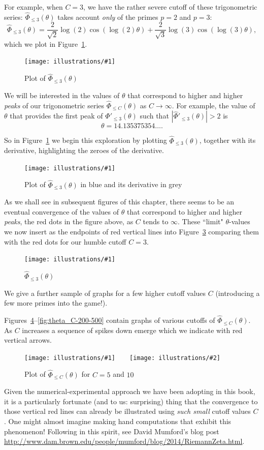 \documentclass[openany]{book}
\newcommand{\ill}[3]{%
   \begin{figure}[H]%
   \vspace{-2ex}
   \centering%
   \texttt{[image: illustrations/\#1]}%
   \caption{#3}%
   \vspace{-2ex}
    \end{figure}}
\newcommand{\illtwo}[4]{%
   \begin{figure}[H]\centering%
   \texttt{[image: illustrations/\#1]}$\qquad$\texttt{[image: illustrations/\#2]}%
   \caption{#4}%
    \end{figure}}
\theoremstyle{plain}
\theoremstyle{definition}
\begin{document}
{For example, when $C=3$, we have the rather severe cutoff of these trigonometric series: ${\hat \Phi}_{\leq 3}(\theta)$ takes account {\it only} of the primes $p=2$ and $p=3$:
$$
  {\hat \Phi}_{\leq 3}(\theta) =
  \frac{2}{\sqrt{2}} \log(2)\cos(\log(2)\theta)
 +
 \frac{2}{\sqrt{3}} \log(3)\cos(\log(3)\theta),
$$
which we plot in Figure~\ref{fig:theta3}.


\ill{theta_3_intro-1}{.85}{Plot of ${\hat \Phi}_{\leq 3}(\theta)$\label{fig:theta3}}


We will be interested in the values of $\theta$ that correspond to higher and higher {\it peaks} of our trigonometric series ${\hat \Phi}_{\leq C}(\theta)$ as $C\to \infty$. For example, the value of $\theta$ that provides the first peak of $
  {\hat \Phi'}_{\leq 3}(\theta)$ such that $
  |{\hat \Phi'}_{\leq 3}(\theta)| > 2$  is $$\theta=14.135375354\ldots.$$

  So in Figure~\ref{fig:theta3} we begin this exploration by plotting ${\hat \Phi}_{\leq 3}(\theta)$, together with its derivative, highlighting the zeroes of the derivative.


\ill{theta_3_intro-2}{.85}{Plot of ${\hat \Phi}_{\leq 3}(\theta)$ in blue and its derivative in grey\label{fig:theta4}}

As we shall see in subsequent figures of this chapter, there seems to be an eventual convergence of the values of $\theta$ that correspond to higher and higher {\it peaks}, the red dots in the figure above,  as $C$ tends to $\infty$. These ``limit" $\theta$-values we now insert as the endpoints of red vertical lines into Figure~\ref{fig:theta5} comparing them with the red dots for our humble cutoff $C=3$.



\ill{theta_C-3}{0.9}{${\hat \Phi}_{\leq 3}(\theta)$ \label{fig:theta5}}



We give a further sample of graphs for a few higher cutoff values $C$ (introducing a few more primes into the game!).

Figures~\ref{fig:theta_C-5-10}--\ref{fig:theta_C-200-500}
contain graphs of various cutoffs of ${\hat \Phi}_{\leq C}(\theta)$.
As $C$ increases a sequence of spikes down emerge
which we indicate with red vertical arrows.



 \illtwo{theta_C-5}{theta_C-10}{0.45}{Plot of ${\hat \Phi}_{\leq C}(\theta)$ for $C=5$ and $10$\label{fig:theta_C-5-10}}

 Given the numerical-experimental approach we have been adopting in this book, it is  a particularly fortunate (and to us: surprising) thing that the convergence to those vertical red lines can already be illustrated using {\it such small} cutoff values $C$.  One might almost imagine making hand computations that exhibit this phenomenon! Following in this spirit, see David Mumford's blog post {\url{http://www.dam.brown.edu/people/mumford/blog/2014/RiemannZeta.html}}.

}
\end{document}

